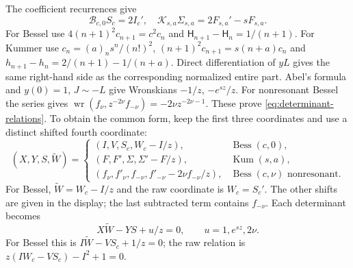 The coefficient recurrences give
\begin{equation}\label{eq:core-inhomogeneous}
\mathscr B_{c,0}S_c=2I_c',\quad \mathscr K_{s,a}\Sigma_{s,a}=2F_{s,a}'-sF_{s,a}.
\end{equation}
For Bessel use $4(n+1)^2c_{n+1}=c^2c_n$ and $\mathsf H_{n+1}-\mathsf H_n=1/(n+1)$. For Kummer use $c_n=(a)_ns^n/(n!)^2$,
$(n+1)^2c_{n+1}=s(n+a)c_n$ and
$h_{n+1}-h_n=2/(n+1)-1/(n+a)$. Direct differentiation of $yL$
gives the same right-hand side as the corresponding normalized entire part.
Abel's formula and $y(0)=1$, $J\sim-L$ give Wronskians $-1/z$,
$-e^{sz}/z$. For nonresonant Bessel the series gives
$\operatorname{wr}(f_\nu,z^{-2\nu}f_{-\nu})=-2\nu z^{-2\nu-1}$.
These prove \eqref{eq:determinant-relations}. To obtain the common form,
keep the first three coordinates and use a distinct shifted fourth coordinate:
\[
 (X,Y,S,\widetilde W)=\begin{cases}
 (I,V,S_c,W_c-I/z),&\operatorname{Bess}(c,0),\\
 (F,F',\Sigma,\Sigma'-F/z),&\operatorname{Kum}(s,a),\\
 (f_\nu,f'_\nu,f_{-\nu},f'_{-\nu}-2\nu f_{-\nu}/z),
   &\operatorname{Bess}(c,\nu)\text{ nonresonant}.
 \end{cases}
\]
For Bessel, $\widetilde W=W_c-I/z$ and the raw coordinate is $W_c=S_c'$.
The other shifts are given in the display; the last subtracted term contains
$f_{-\nu}$. Each determinant becomes
\begin{equation}\label{eq:core-quadric}
X\widetilde W-YS+u/z=0,\qquad u=1,e^{sz},2\nu.
\end{equation}
For Bessel this is $I\widetilde W-VS_c+1/z=0$; the raw relation is
$z(IW_c-VS_c)-I^2+1=0$.

